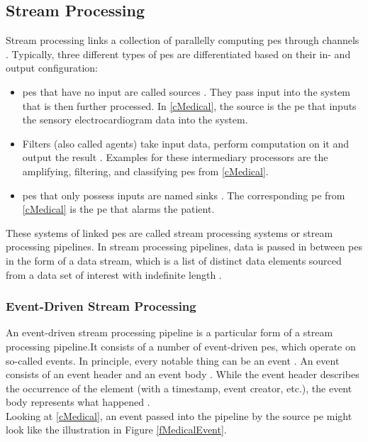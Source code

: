 \subsection{Stream Processing}
\label{lStreamProcessing}
Stream processing links a collection of parallelly computing \gls{pe}s through channels \cite{Stephens.1997}. Typically, three different types of \gls{pe}s are differentiated based on their in- and output configuration:
\begin{itemize}
    \item \gls{pe}s that have no input are called sources \cite{Stephens.1997}. They pass input into the system that is then further processed. In \ref{cMedical}, the source is the \gls{pe} that inputs the sensory electrocardiogram data into the system.
    \item Filters (also called agents) take input data, perform computation on it and output the result \cite{Stephens.1997}. Examples for these intermediary processors are the amplifying, filtering, and classifying \gls{pe}s from \ref{cMedical}.
    \item \gls{pe}s that only possess inputs are named sinks \cite{Stephens.1997}. The corresponding \gls{pe} from \ref{cMedical} is the \gls{pe} that alarms the patient.
\end{itemize}
These systems of linked \gls{pe}s are called stream processing systems \cite{Stephens.1997} or stream processing pipelines. In stream processing pipelines, data is passed in between \gls{pe}s in the form of a data stream, which is a list of distinct data elements sourced from a data set of interest with indefinite length \cite{Stephens.1997}.\par

\subsubsection{Event-Driven Stream Processing}
\label{lEventDrivenStreamProcessing}

An event-driven stream processing pipeline is a particular form of a stream processing pipeline.It consists of a number of event-driven \gls{pe}s, which operate on so-called events. In principle, every notable thing can be an event \cite{Michelson.2006}. An event consists of an event header and an event body \cite{Michelson.2006}. While the event header describes the occurrence of the element (with a timestamp, event creator, etc.), the event body represents what happened \cite{Michelson.2006}.\\
Looking at \ref{cMedical}, an event passed into the pipeline by the source \gls{pe} might look like the illustration in Figure \ref{fMedicalEvent}.\par

